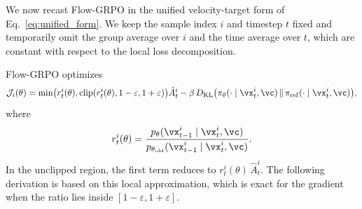 \documentclass{article} %
\begin{document}




We now recast Flow-GRPO in the unified velocity-target form of
Eq.~\eqref{eq:unified_form}. We keep the sample index $i$ and timestep $t$
fixed and temporarily omit the group average over $i$ and the time average
over $t$, which are constant with respect to the local loss decomposition.

Flow-GRPO optimizes
\begin{equation}
\label{eq:flowgrpo_per_sample_obj}
\mathcal{J}_i(\theta)
=
\min\bigl(r^i_t(\theta),
\operatorname{clip}(r^i_t(\theta),1-\varepsilon,1+\varepsilon)\bigr)
\hat{A}^i_t
-
\beta\,
D_{\mathrm{KL}}\bigl(\pi_\theta(\cdot\mid \vx^i_t,\vc)
\,\|\,
\pi_{\mathrm{ref}}(\cdot\mid \vx^i_t,\vc)\bigr),
\end{equation}
where
\begin{equation}
r^i_t(\theta)
=
\frac{p_\theta(\vx^i_{t-1}\mid \vx^i_t,\vc)}
{p_{\theta_{\mathrm{old}}}(\vx^i_{t-1}\mid \vx^i_t,\vc)} .
\end{equation}
In the unclipped region, the first term reduces to
$r^i_t(\theta)\,\hat{A}^i_t$. The following derivation is based on this
local approximation, which is exact for the gradient when the ratio lies
inside $[1-\varepsilon,1+\varepsilon]$.
\end{document}
